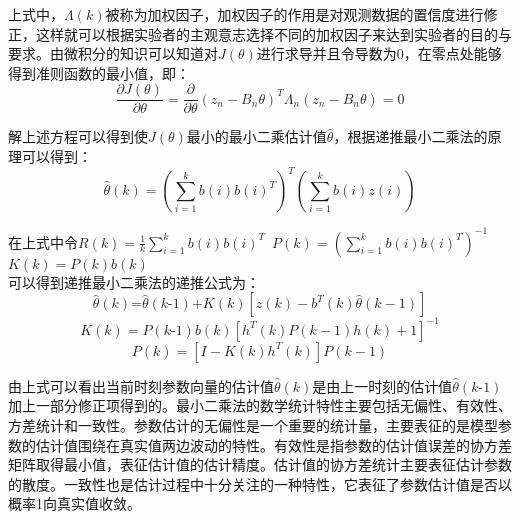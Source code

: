 上式中，$\Lambda \left( k \right)$被称为加权因子，加权因子的作用是对观测数据的置信度进行修正，这样就可以根据实验者的主观意志选择不同的加权因子来达到实验者的目的与要求。由微积分的知识可以知道对$J\left( \theta  \right)$进行求导并且令导数为0，在零点处能够得到准则函数的最小值，即：
\begin{equation}
\frac{\partial J\left( \theta  \right)}{\partial \theta }=\frac{\partial }{\partial \theta }{{\left( {{z}_{n}}-{{B}_{n}}\theta  \right)}^{T}}{{\Lambda }_{n}}\left( {{z}_{n}}-{{B}_{n}}\theta  \right)=0
\end{equation}

解上述方程可以得到使$J\left( \theta  \right)$最小的最小二乘估计值$\hat{\theta }$，根据递推最小二乘法的原理可以得到：
\begin{equation}
\hat{\theta }\left( k \right)={{\left( \sum\limits_{i=1}^{k}{b\left( i \right)b{{\left( i \right)}^{T}}} \right)}^{T}}\left( \sum\limits_{i=1}^{k}{b\left( i \right)z\left( i \right)} \right)
\end{equation}

在上式中令$R\left( k \right)=\frac{1}{k}\sum\limits_{i=1}^{k}{b\left( i \right)b{{\left( i \right)}^{T}}}$~$P\left( k \right)={{\left( \sum\limits_{i=1}^{k}{b\left( i \right)b{{\left( i \right)}^{T}}} \right)}^{-1}}$~$K\left( k \right)=P\left( k \right)b\left( k \right)$\\可以得到递推最小二乘法的递推公式为：
\begin{equation}
\hat{\theta }\left( k \right)\text{=}\hat{\theta }\left( k\text{-}1 \right)\text{+}K\left( k \right)\left[ z\left( k \right)-{{b}^{T}}\left( k \right)\hat{\theta }\left( k-1 \right) \right]
\end{equation}
\begin{equation}
K\left( k \right)=P\left( k\text{-}1 \right)b\left( k \right){{\left[ {{h}^{T}}\left( k \right)P\left( k-1 \right)h\left( k \right)+1 \right]}^{-1}}
\end{equation}
\begin{equation}
P\left( k \right)=\left[ I-K\left( k \right){{h}^{T}}\left( k \right) \right]P\left( k-1 \right)
\end{equation}

由上式可以看出当前时刻参数向量的估计值$\hat{\theta }\left( k \right)$是由上一时刻的估计值$\hat{\theta }\left( k\text{-}1 \right)$\\加上一部分修正项得到的。最小二乘法的数学统计特性主要包括无偏性、有效性、方差统计和一致性。参数估计的无偏性是一个重要的统计量，主要表征的是模型参数的估计值围绕在真实值两边波动的特性。有效性是指参数的估计值误差的协方差矩阵取得最小值，表征估计值的估计精度。估计值的协方差统计主要表征估计参数的散度。一致性也是估计过程中十分关注的一种特性，它表征了参数估计值是否以概率1向真实值收敛。
